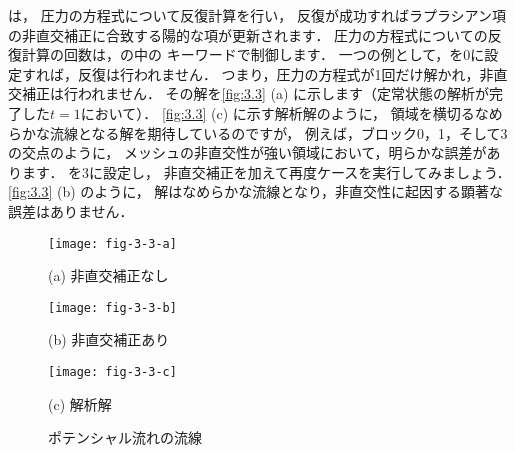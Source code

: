 は，
圧力の方程式について反復計算を行い，
反復が成功すればラプラシアン項の非直交補正に合致する陽的な項が更新されます．
圧力の方程式についての反復計算の回数は，の中の
キーワードで制御します．
一つの例として，を0に設定すれば，反復は行われません．
つまり，圧力の方程式が1回だけ解かれ，非直交補正は行われません．
その解を\autoref{fig:3.3} (a) に示します（定常状態の解析が完了した$t = 1$において）．
\autoref{fig:3.3} (c) に示す解析解のように，
領域を横切るなめらかな流線となる解を期待しているのですが，
例えば，ブロック0，1，そして3の交点のように，
メッシュの非直交性が強い領域において，明らかな誤差があります．
を3に設定し，
非直交補正を加えて再度ケースを実行してみましょう．
\autoref{fig:3.3} (b) のように，
解はなめらかな流線となり，非直交性に起因する顕著な誤差はありません．


\begin{figure}[p]
 \texttt{[image: fig-3-3-a]}\par
 \medskip
 (a) 非直交補正なし\par
 \bigskip
 \texttt{[image: fig-3-3-b]}\par
 \medskip
 (b) 非直交補正あり\par
 \bigskip
 \texttt{[image: fig-3-3-c]}\par
 \medskip
 (c) 解析解\par
 \medskip
 \caption{ポテンシャル流れの流線}
 \label{fig:3.3}
\end{figure}




